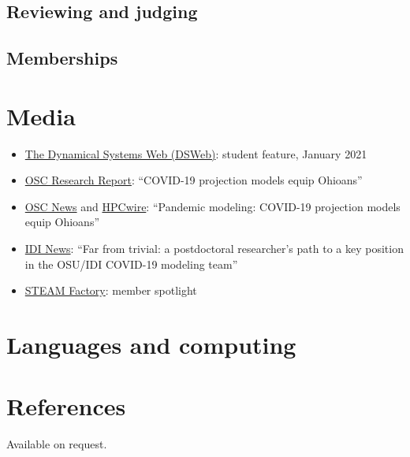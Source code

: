 \documentclass[11pt,a4paper]{article}
\begin{document}
\subsection{Reviewing and judging}

\subsection{Memberships}

\section{Media}
\begin{itemize}
  \item \href{https://dsweb.siam.org/The-Magazine/Article/student-feature-wasiur-rahman-khuda-bukhsh}{The Dynamical Systems Web (DSWeb)}: student feature, January 2021
  \item \href{https://tinyurl.com/resrchrprt}{OSC Research Report}: ``COVID-19 projection models equip Ohioans''
  \item \href{https://www.osc.edu/press/pandemic_modeling_covid_19_projection_models_equip_ohioans}{OSC News} and \href{https://www.hpcwire.com/off-the-wire/pandemic-modeling-covid-19-projection-models-equip-ohioans/}{HPCwire}: ``Pandemic modeling: COVID-19 projection models equip Ohioans''
  \item \href{https://idi.osu.edu/news-articles/far-from-trivial}{IDI News}: ``Far from trivial: a postdoctoral researcher's path to a key position in the OSU/IDI COVID-19 modeling team''
  \item \href{https://www.youtube.com/watch?v=j_DEgauzw7w}{STEAM Factory}: member spotlight
\end{itemize}

\section{Languages and computing}

\section{References}
Available on request.
\end{document}
